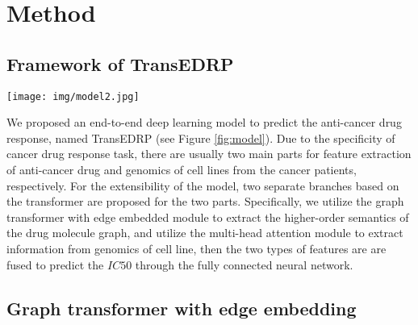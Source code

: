 \documentclass{article}
\begin{document}
\section{Method}

\subsection{Framework of TransEDRP }

\begin{figure*}[!ht]
    \centering
    \texttt{[image: img/model2.jpg]}
    \caption{The framework illustration for TransEDRP. The inputs of the model are the drug SMILES string and the genomics sequence of cell lines, respectively. Our model therefore consists of three components: an encoder module for the drug, an encoder module for the genomics, and a prediction module for the interactions between the drugs and the genomics.}
    \label{fig:model}
\end{figure*}


We proposed an end-to-end deep learning model to predict the anti-cancer drug response, named TransEDRP (see Figure \ref{fig:model}). Due to the specificity of  cancer drug response task, there are usually two main parts for feature extraction of anti-cancer drug and genomics of cell lines from the cancer patients, respectively. For the extensibility of the model, two separate branches based on the transformer are proposed for the two parts. Specifically,  we utilize the graph transformer with edge embedded module to extract the higher-order semantics of the drug molecule graph,  and utilize the multi-head attention module to extract information from genomics of cell line, then the two types of features are are fused to predict the $IC50$ through the fully connected neural network.






















\subsection{Graph transformer with edge embedding}
\end{document}
